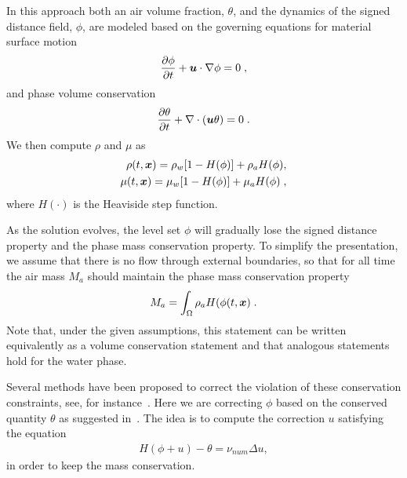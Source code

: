 In this approach both an air volume fraction, $\theta$, and the dynamics of the signed distance field, $\phi$, are modeled based on the governing equations for material surface motion
\begin{align}
\label{eq:ls_transport_1}
\frac{\partial \phi}{\partial t} + \boldsymbol{u}\cdot\nabla\phi = 0 \; ,
\end{align}
and phase volume conservation
\begin{align}
\label{eq:ls_transport_2}
\frac{\partial \theta}{\partial t} + \nabla\cdot(\boldsymbol{u}\theta) = 0 \; .
\end{align}
We then compute $\rho$ and $\mu$ as 
\begin{align}
\label{eq:two_phase_rho}
\rho(t,\boldsymbol{x}) = \rho_w [1-H(\phi)] + \rho_a H(\phi),\\
\label{eq:two_phase_nu}
\mu(t,\boldsymbol{x}) = \mu_w [1-H(\phi)] + \mu_a H(\phi) \; ,
\end{align}
where $H(\cdot)$ is the Heaviside step function. 

As the solution evolves, the level set $\phi$ will gradually lose the signed distance property and the phase mass conservation property. To simplify the presentation, we assume that there is no flow through external boundaries, so that for all time the air mass $M_a$ should maintain the phase mass conservation property
\begin{equation}
M_a = \int_{\Omega} \rho_a H(\phi(t,\boldsymbol{x}) \; .
\end{equation}
Note that, under the given assumptions, this statement can be written equivalently as a volume conservation statement and that analogous statements hold for the water phase.

Several methods have been proposed to correct the violation of these conservation constraints, see, for instance~\cite{Sussman2000,PSVW2004}. 
Here we are correcting $\phi$ based on the conserved quantity $\theta$ as suggested in~\cite{KAFB11}. The idea is to compute the correction $u$ satisfying the equation
\begin{align}
\label{eq:mass_correction}
H(\phi+u) - \theta = \nu_{num} \Delta u,
\end{align}
in order to keep the mass conservation.


